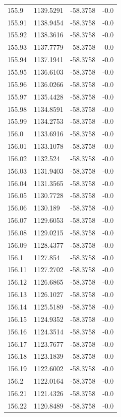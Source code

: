 \begin{table}[H]
\begin{tabular}{llll}
155.9 & 1139.5291 & -58.3758 & -0.0 \\
155.91 & 1138.9454 & -58.3758 & -0.0 \\
155.92 & 1138.3616 & -58.3758 & -0.0 \\
155.93 & 1137.7779 & -58.3758 & -0.0 \\
155.94 & 1137.1941 & -58.3758 & -0.0 \\
155.95 & 1136.6103 & -58.3758 & -0.0 \\
155.96 & 1136.0266 & -58.3758 & -0.0 \\
155.97 & 1135.4428 & -58.3758 & -0.0 \\
155.98 & 1134.8591 & -58.3758 & -0.0 \\
155.99 & 1134.2753 & -58.3758 & -0.0 \\
156.0 & 1133.6916 & -58.3758 & -0.0 \\
156.01 & 1133.1078 & -58.3758 & -0.0 \\
156.02 & 1132.524 & -58.3758 & -0.0 \\
156.03 & 1131.9403 & -58.3758 & -0.0 \\
156.04 & 1131.3565 & -58.3758 & -0.0 \\
156.05 & 1130.7728 & -58.3758 & -0.0 \\
156.06 & 1130.189 & -58.3758 & -0.0 \\
156.07 & 1129.6053 & -58.3758 & -0.0 \\
156.08 & 1129.0215 & -58.3758 & -0.0 \\
156.09 & 1128.4377 & -58.3758 & -0.0 \\
156.1 & 1127.854 & -58.3758 & -0.0 \\
156.11 & 1127.2702 & -58.3758 & -0.0 \\
156.12 & 1126.6865 & -58.3758 & -0.0 \\
156.13 & 1126.1027 & -58.3758 & -0.0 \\
156.14 & 1125.5189 & -58.3758 & -0.0 \\
156.15 & 1124.9352 & -58.3758 & -0.0 \\
156.16 & 1124.3514 & -58.3758 & -0.0 \\
156.17 & 1123.7677 & -58.3758 & -0.0 \\
156.18 & 1123.1839 & -58.3758 & -0.0 \\
156.19 & 1122.6002 & -58.3758 & -0.0 \\
156.2 & 1122.0164 & -58.3758 & -0.0 \\
156.21 & 1121.4326 & -58.3758 & -0.0 \\
156.22 & 1120.8489 & -58.3758 & -0.0 \\

\end{tabular}
\end{table}
